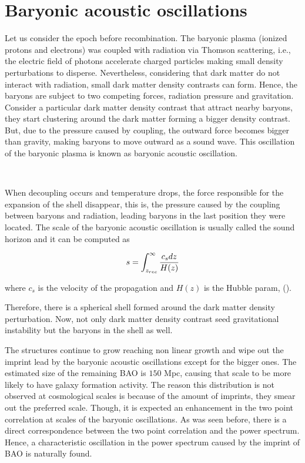 \section{ Baryonic acoustic oscillations }

Let us consider the epoch before recombination. The baryonic plasma (ionized protons and electrons) was coupled with radiation via 
Thomson scattering,  i.e., the electric field of photons accelerate charged particles making small density perturbations to disperse. Nevertheless,
considering that dark matter do not interact with radiation, small dark matter density contrasts can form. Hence, the baryons are 
subject to two competing forces, radiation pressure and gravitation. Consider a particular dark matter density contrast that attract
nearby baryons, they start clustering around the dark matter forming a bigger density contrast. But, due to the pressure caused
by coupling, the outward force becomes bigger than gravity, making baryons to move outward as a sound wave. This oscillation 
of the baryonic plasma is known as baryonic acoustic oscillation. 

\

When decoupling occurs and temperature drops, the force responsible for the expansion of the shell disappear, this is, 
the pressure caused by the coupling between baryons and radiation, leading baryons in the last position they were located. 
The scale of the baryonic acoustic oscillation is 
usually called the sound horizon and it can be computed as

\begin{equation} 
s = \int_{z_{rec}}^{\infty} \frac{c_s dz}{H(z)}
\label{SH}
\end{equation}


where $c_s$ is the velocity of the propagation and $H(z)$ is the Hubble param, (\cite{Pilar}). 

Therefore, there is a spherical shell formed 
around the dark matter density perturbation. Now, not only dark matter density contrast seed gravitational instability but the baryons in the shell as well. 

The structures continue to grow reaching non linear growth and wipe out the imprint lead by the baryonic acoustic oscillations except for the bigger ones. The estimated size of the remaining BAO is $150$ Mpc, causing that scale to 
be more likely to have galaxy formation activity. The reason this distribution is not observed at cosmological scales is because
of the amount of imprints, they smear out the preferred scale. Though, it is expected an enhancement in the two point
correlation at scales of the baryonic oscillations. As was seen before, there is a direct correspondence between the 
two point correlation and the power spectrum. Hence, a characteristic oscillation in the power spectrum caused by the imprint of BAO is naturally found. 	

